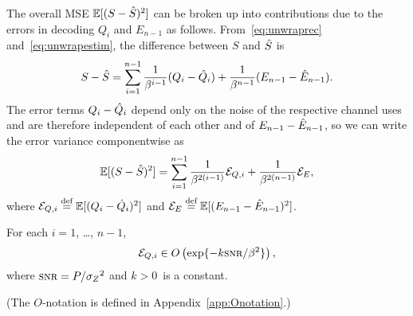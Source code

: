 The overall MSE $\mathbb{E}[(S-\hat{S})^2]$ can be broken up into contributions due to the
errors in decoding $Q_i$ and $E_{n-1}$ as follows. From~\eqref{eq:unwraprec}
and~\eqref{eq:unwrapestim}, the difference between $S$ and $\hat{S}$ is
\begin{equation*}
  S - \hat{S} = \sum_{i=1}^{n-1} \frac1{\beta^{i-1}} (Q_i - \hat{Q}_i) + \frac1{\beta^{n-1}}
  (E_{n-1} - \hat{E}_{n-1}).
\end{equation*}
The error terms $Q_i - \hat{Q}_i$ depend only on the noise of the respective channel
uses and are therefore independent of each other and of $E_{n-1} - \hat{E}_{n-1}$,
so we can write the error variance componentwise as
\begin{equation}
  \label{eq:totalerror}
  \mathbb{E}[(S-\hat{S})^2] = \sum_{i=1}^{n-1} \frac{1}{\beta^{2(i-1)}} {{\mathcal{E}}_{Q,i}} +
  \frac{1}{\beta^{2(n-1)}} {{\mathcal{E}}_E}, 
\end{equation}
where ${{\mathcal{E}}_{Q,i}} \stackrel{\text{def}}{=} \mathbb{E}[(Q_i - \hat{Q}_i)^2]$ and ${{\mathcal{E}}_E} \stackrel{\text{def}}{=} \mathbb{E}[(E_{n-1} -
\hat{E}_{n-1})^2]$.

\begin{lemma}
  \label{lem:eqbound}
  For each $i = 1$, \dots, $n-1$, 
  \begin{equation}
    \label{eq:eqidecay}
    \Eqi \in O\left(\exp\{-k \snr/\beta^2\}\right),
  \end{equation}
  where $\snr = P/\szq$ and $k > 0$~is a constant.
\end{lemma}
(The $O$-notation is defined in Appendix~\ref{app:Onotation}.)

